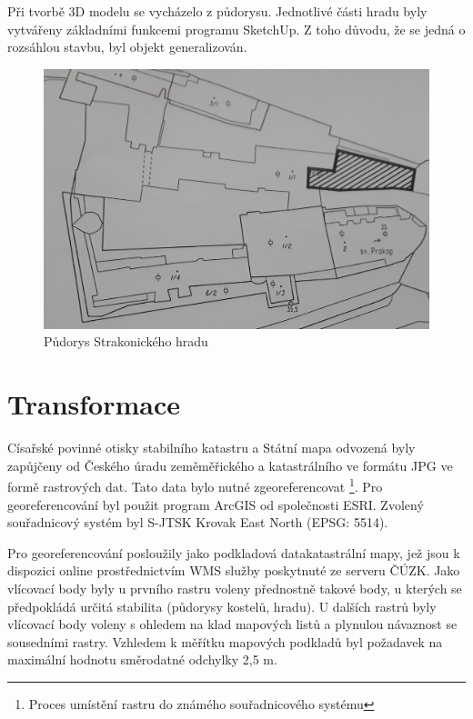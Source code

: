 \documentclass[thesis=M,czech]{FITthesis}[2012/06/26]
\begin{document}
Při tvorbě 3D modelu se vycházelo z půdorysu. Jednotlivé části hradu byly vytvářeny základními funkcemi programu SketchUp. Z toho důvodu, že se jedná o rozsáhlou stavbu, byl objekt generalizován. 

\begin{figure}[h]
	\centering
	\includegraphics[width=13cm]{pics/pudorys_hrad.jpg}
	\caption{Půdorys Strakonického hradu}
	\label{obrazek:pudorys}
\end{figure}


\cite{sketchup1} \cite{sketchup2}

\section{Transformace}
Císařské povinné otisky stabilního katastru a Státní mapa odvozená byly zapůjčeny od Českého úradu zeměměřického a katastrálního ve formátu JPG ve formě rastrových dat. Tato data bylo nutné zgeoreferencovat \footnote{Proces umístění rastru do známého souřadnicového systému}. Pro georeferencování byl použit program ArcGIS od společnosti ESRI. Zvolený souřadnicový systém byl S-JTSK Krovak East North (EPSG: 5514). 

Pro georeferencování posloužily jako podkladová datakatastrální mapy, jež jsou k dispozici online prostřednictvím WMS služby poskytnuté ze serveru ČÚZK.  Jako vlícovací body byly u prvního rastru voleny přednostně takové body, u kterých se předpokládá určitá stabilita (půdorysy kostelů, hradu). U dalších rastrů byly vlícovací body voleny s ohledem na klad mapových listů a plynulou návaznost se sousedními rastry. Vzhledem k měřítku mapových podkladů byl požadavek na maximální hodnotu směrodatné odchylky 2,5 m. 
\end{document}
